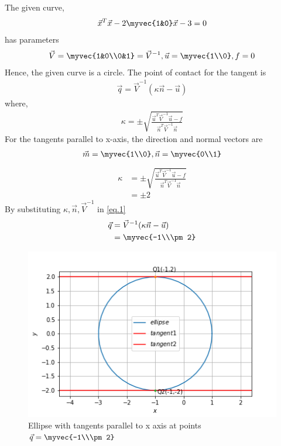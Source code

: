 The given curve,
\begin{align}
    \vec{x}^T\vec{x}-2\myvec{1&0}\vec{x}-3=0
\end{align}
has parameters
\begin{align}
    \vec{V}=\myvec{1&0\\0&1}=\vec{V}^{-1}, \vec{u}=\myvec{1\\0}, f=0
\end{align}
Hence, the given curve is a circle. The point of contact for the tangent is
\begin{align}
    \vec{q}=\vec{V}^{-1}(\kappa \vec{n}-\vec{u})
    \label{eq.1}
\end{align}
where,
\begin{align}
    \kappa=\pm\sqrt{\frac{\vec{u}^T\vec{V}^{-1}\vec{u}-f}{\vec{n}^T\vec{V}^{-1}\vec{n}}} 
\end{align}
For the tangents parallel to x-axis, the direction and normal vectors are 
\begin{align}
    \vec{m}=\myvec{1\\0}, \vec{n}=\myvec{0\\1}\end{align}
    \begin{align}
        \kappa&=\pm\sqrt{\frac{\vec{u}^T\vec{V}^{-1}\vec{u}-f}{\vec{n}^T\vec{V}^{-1}\vec{n}}}\\
        &=\pm2
    \end{align}
By substituting $\kappa, \vec{n}, \vec{V}^{-1}$ in \eqref{eq.1}
\begin{align}
    \vec{q}&=\vec{V}^{-1}(\kappa \vec{n}-\vec{u})\\
    &=\myvec{-1\\\pm2}
\end{align}

\begin{figure}[h]
\centering
\includegraphics[width=\columnwidth]{solutions/sep/2/4/Figures/ellipse.1.png}
\caption{Ellipse with tangents parallel to x axis at points $\vec{q}=\myvec{-1\\\pm2}$}
\label{Fig 1.1}

\end{figure}

